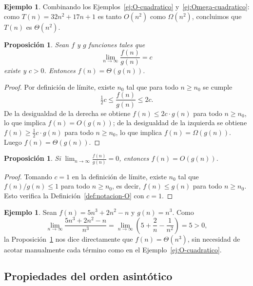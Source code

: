 \documentclass[12pt, spanish, oneside, openany]{book}
\theoremstyle{uprightplain}
\newtheorem{proposicion}[teorema]{Proposición}
\theoremstyle{definition}
\newtheorem{ejemplo}[teorema]{Ejemplo}
\theoremstyle{remark}
\theoremstyle{definition}
\begin{document}
\begin{ejemplo}
Combinando los Ejemplos~\ref{ej:O-cuadratico} y~\ref{ej:Omega-cuadratico}: como $T(n)=32n^2+17n+1$ es tanto $O(n^2)$ como $\Omega(n^2)$, concluimos que $T(n)$ es $\Theta(n^2)$.
\end{ejemplo}

\begin{proposicion}
\label{prop:limite-theta}
Sean $f$ y $g$ funciones tales que
\[
\lim_{n\to\infty} \frac{f(n)}{g(n)} = c
\]
existe y $c>0$. Entonces $f(n)=\Theta(g(n))$.
\end{proposicion}
\begin{proof}
Por definición de límite, existe $n_0$ tal que para todo $n\ge n_0$ se cumple
\[
\tfrac{1}{2}c \le \frac{f(n)}{g(n)} \le 2c.
\]
De la desigualdad de la derecha se obtiene $f(n)\le 2c\cdot g(n)$ para todo $n\ge n_0$, lo que implica $f(n)=O(g(n))$; de la desigualdad de la izquierda se obtiene $f(n)\ge \tfrac{1}{2}c\cdot g(n)$ para todo $n\ge n_0$, lo que implica $f(n)=\Omega(g(n))$. Luego $f(n)=\Theta(g(n))$.
\end{proof}

\begin{proposicion}
\label{prop:limite-O}
Si $\displaystyle\lim_{n\to\infty}\frac{f(n)}{g(n)}=0$, entonces $f(n)=O(g(n))$.
\end{proposicion}
\begin{proof}
Tomando $c=1$ en la definición de límite, existe $n_0$ tal que $f(n)/g(n)\le 1$ para todo $n\ge n_0$, es decir, $f(n)\le g(n)$ para todo $n\ge n_0$. Esto verifica la Definición~\ref{def:notacion-O} con $c=1$.
\end{proof}

\begin{ejemplo}
\label{ej:limite-uso}
Sean $f(n)=5n^3+2n^2-n$ y $g(n)=n^3$. Como
\[
\lim_{n\to\infty} \frac{5n^3+2n^2-n}{n^3} = \lim_{n\to\infty}\left(5+\frac{2}{n}-\frac{1}{n^2}\right) = 5 > 0,
\]
la Proposición~\ref{prop:limite-theta} nos dice directamente que $f(n)=\Theta(n^3)$, sin necesidad de acotar manualmente cada término como en el Ejemplo~\ref{ej:O-cuadratico}.
\end{ejemplo}

\subsection{Propiedades del orden asintótico}
\end{document}
